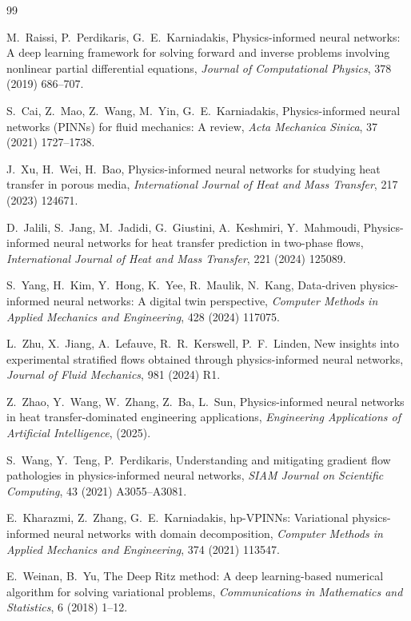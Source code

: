 \documentclass[review]{elsarticle}
\begin{document}
\begin{thebibliography}{99}

M.~Raissi, P.~Perdikaris, G.~E.~Karniadakis,
Physics-informed neural networks: A deep learning framework for solving forward and inverse problems involving nonlinear partial differential equations,
\emph{Journal of Computational Physics},
378 (2019) 686--707.

S.~Cai, Z.~Mao, Z.~Wang, M.~Yin, G.~E.~Karniadakis,
Physics-informed neural networks (PINNs) for fluid mechanics: A review,
\emph{Acta Mechanica Sinica},
37 (2021) 1727--1738.

J.~Xu, H.~Wei, H.~Bao,
Physics-informed neural networks for studying heat transfer in porous media,
\emph{International Journal of Heat and Mass Transfer},
217 (2023) 124671.

D.~Jalili, S.~Jang, M.~Jadidi, G.~Giustini, A.~Keshmiri, Y.~Mahmoudi,
Physics-informed neural networks for heat transfer prediction in two-phase flows,
\emph{International Journal of Heat and Mass Transfer},
221 (2024) 125089.

S.~Yang, H.~Kim, Y.~Hong, K.~Yee, R.~Maulik, N.~Kang,
Data-driven physics-informed neural networks: A digital twin perspective,
\emph{Computer Methods in Applied Mechanics and Engineering},
428 (2024) 117075.

L.~Zhu, X.~Jiang, A.~Lefauve, R.~R.~Kerswell, P.~F.~Linden,
New insights into experimental stratified flows obtained through physics-informed neural networks,
\emph{Journal of Fluid Mechanics},
981 (2024) R1.

Z.~Zhao, Y.~Wang, W.~Zhang, Z.~Ba, L.~Sun,
Physics-informed neural networks in heat transfer-dominated engineering applications,
\emph{Engineering Applications of Artificial Intelligence},
(2025).

S.~Wang, Y.~Teng, P.~Perdikaris,
Understanding and mitigating gradient flow pathologies in physics-informed neural networks,
\emph{SIAM Journal on Scientific Computing},
43 (2021) A3055--A3081.

E.~Kharazmi, Z.~Zhang, G.~E.~Karniadakis,
hp-VPINNs: Variational physics-informed neural networks with domain decomposition,
\emph{Computer Methods in Applied Mechanics and Engineering},
374 (2021) 113547.

E.~Weinan, B.~Yu,
The Deep Ritz method: A deep learning-based numerical algorithm for solving variational problems,
\emph{Communications in Mathematics and Statistics},
6 (2018) 1--12.


\end{thebibliography}
\end{document}
